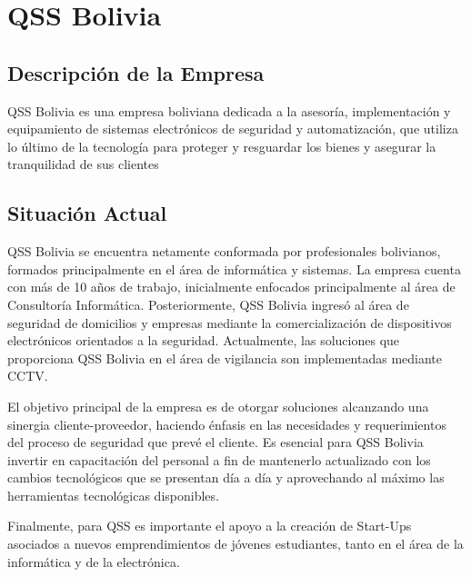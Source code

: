 \chapter{QSS Bolivia}
\section{Descripción de la Empresa}

    QSS Bolivia es una empresa boliviana dedicada a la asesoría, implementación y equipamiento de sistemas electrónicos de seguridad y automatización, que utiliza lo último de la tecnología para proteger y resguardar los bienes y asegurar la tranquilidad de sus clientes \cite{QSSBolvia2016-el}

\section{Situación Actual}
    QSS Bolivia se encuentra netamente conformada por profesionales bolivianos, formados principalmente en el área de informática y sistemas. La empresa cuenta con más de 10 años de trabajo, inicialmente enfocados principalmente al área de Consultoría Informática. Posteriormente, QSS Bolivia ingresó al área de seguridad de domicilios y empresas mediante la comercialización de dispositivos electrónicos orientados a la seguridad.
    Actualmente, las soluciones que proporciona QSS Bolivia en el área de vigilancia son implementadas mediante CCTV.
    
    El objetivo principal de la empresa es de otorgar soluciones alcanzando una sinergia cliente-proveedor, haciendo énfasis en las necesidades y requerimientos del proceso de seguridad que prevé el cliente.  
    Es esencial para QSS Bolivia invertir en capacitación del personal a fin de mantenerlo actualizado con los cambios tecnológicos que se presentan día a día y aprovechando al máximo las herramientas tecnológicas disponibles. 
    
    Finalmente, para QSS es importante el apoyo a la creación de Start-Ups asociados a nuevos emprendimientos de jóvenes estudiantes, tanto en el área de la informática y de la electrónica.

